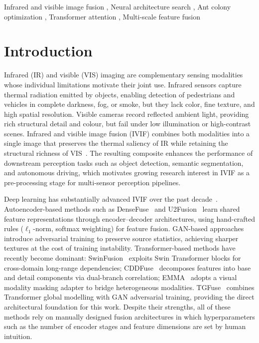 \documentclass[a4paper,fleqn]{cas-dc}
\begin{document}
\begin{keywords}
Infrared and visible image fusion \sep
Neural architecture search \sep
Ant colony optimization \sep
Transformer attention \sep
Multi-scale feature fusion
\end{keywords}

\maketitle

\section{Introduction}
\label{sec:intro}

Infrared (IR) and visible (VIS) imaging are complementary sensing modalities
whose individual limitations motivate their joint use.  Infrared sensors
capture thermal radiation emitted by objects, enabling detection of pedestrians
and vehicles in complete darkness, fog, or smoke, but they lack color, fine
texture, and high spatial resolution.  Visible cameras record reflected ambient
light, providing rich structural detail and colour, but fail under low
illumination or high-contrast scenes.  Infrared and visible image fusion
(IVIF) combines both modalities into a single image that preserves the
thermal saliency of IR while retaining the structural richness of
VIS~\cite{u2fusion2022,piafusion2022,tardal2022}.  The resulting composite
enhances the performance of downstream perception tasks such as object
detection, semantic segmentation, and autonomous driving, which motivates
growing research interest in IVIF as a pre-processing stage for multi-sensor
perception pipelines.

Deep learning has substantially advanced IVIF over the past
decade~\cite{densefuse2019,swinfusion2022,cddfuse2023,emma2024}.
Autoencoder-based methods such as DenseFuse~\cite{densefuse2019} and
U2Fusion~\cite{u2fusion2022} learn shared feature representations through
encoder--decoder architectures, using hand-crafted rules ($\ell_1$-norm,
softmax weighting) for feature fusion.  GAN-based
approaches~\cite{gan2014,tgfuse2023} introduce adversarial training to
preserve source statistics, achieving sharper textures at the cost of
training instability.  Transformer-based methods have recently become
dominant: SwinFusion~\cite{swinfusion2022} exploits Swin Transformer blocks
for cross-domain long-range dependencies; CDDFuse~\cite{cddfuse2023}
decomposes features into base and detail components via dual-branch
correlation; EMMA~\cite{emma2024} adopts a visual modality masking adapter to
bridge heterogeneous modalities.  TGFuse~\cite{tgfuse2023} combines
Transformer global modelling with GAN adversarial training, providing the
direct architectural foundation for this work.  Despite their strengths,
all of these methods rely on manually designed fusion architectures in which
hyperparameters such as the number of encoder stages and feature dimensions
are set by human intuition.
\end{document}
